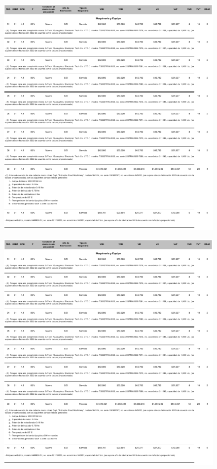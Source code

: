 \begin{figure}[hbtp!]
	\centering
	\includegraphics[width=  \linewidth, page = 3]{../0.imagenes/CAP_10/cap_10}
\end{figure}
\newpage

\begin{figure}[hbtp!]
	\centering
	\includegraphics[width=  \linewidth, page = 4]{../0.imagenes/CAP_10/cap_10}
\end{figure}
\newpage

